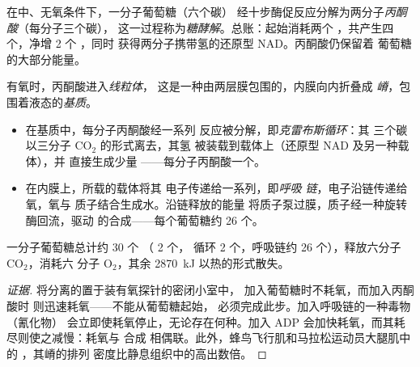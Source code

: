 \begin{proposition}[糖酵解]\label{prop:g12:respiration-fermentation:glycolysis}
在中、无氧条件下，一分子葡萄糖（六个碳）
经十步酶促反应分解为两分子\emph{丙酮酸}（每分子三个碳），
这一过程称为\emph{糖酵解}。总账：起始消耗两个
，共产生四个，净增 2 个 ，同时
获得两分子携带氢的还原型 NAD。丙酮酸仍保留着
葡萄糖的大部分能量。
\end{proposition}
\admitted

\begin{proposition}[线粒体完成氧化]\label{prop:g12:respiration-fermentation:mitochondrion}
有氧时，丙酮酸进入\emph{线粒体}，
这是一种由两层膜包围的，内膜向内折叠成
\emph{嵴}，包围着液态的\emph{基质}。
\begin{itemize}
  \item 在基质中，每分子丙酮酸经一系列
        反应被分解，即\emph{克雷布斯循环}：其
        三个碳以三分子 $\mathrm{CO_2}$ 的形式离去，其氢
        被装载到载体上（还原型 NAD 及另一种载体），并
        直接生成少量 ——每分子丙酮酸一个。
  \item 在内膜上，所载的载体将其
        电子传递给一系列，即\emph{呼吸
        链}，电子沿链传递给氧，氧与
        质子结合生成水。沿链释放的能量
        将质子泵过膜，质子经一种旋转
        酶回流，驱动  的合成——每个葡萄糖约
        26 个。
\end{itemize}
一分子葡萄糖总计约 30 个 （ 2 个，
循环 2 个，呼吸链约 26 个），释放六分子 $\mathrm{CO_2}$，消耗六
分子 $\mathrm{O_2}$，其余 \qty{2870}{kJ} 以热的形式散失。
\end{proposition}
\begin{proof}[证据]
将分离的置于装有氧探针的密闭小室中，
加入葡萄糖时不耗氧，而加入丙酮酸时
则迅速耗氧——不能从葡萄糖起始，
必须完成此步。加入呼吸链的一种毒物（氰化物）
会立即使耗氧停止，无论存在何种。加入
ADP 会加快耗氧，而其耗尽则使之减慢：耗氧与  合成
相偶联。此外，蜂鸟飞行肌和马拉松运动员大腿肌中的
，其嵴的排列
密度比静息组织中的高出数倍。
\end{proof}

